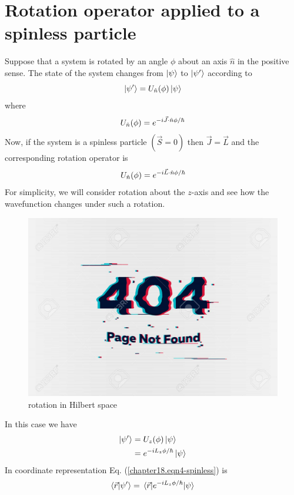 \section{Rotation operator applied to a spinless particle}
Suppose that a system is rotated by an angle $\phi$ about an axis $\hat{n}$ in the positive sense. The state of the system changes from $\ket{\psi}$ to $\ket{\psi^\prime}$ according to 
\begin{equation}
\label{chapter18.eqn1-spinless}
\ket{\psi^\prime} = U_{\hat{n}}\qty(\phi) \ket{\psi}
\end{equation}
where
\begin{equation}
\label{chapter18.eqn2-spinless}
	 U_{\hat{n}}\qty(\phi) = e^{-i \vec{J}\cdot\hat{n} \phi/\hbar}
\end{equation}
Now, if the system is a spinless particle $(\vec{S}=0)$ then $\vec{J} = \vec{L}$ and the corresponding rotation operator is
\begin{equation}
\label{chapter18.eqn3-spinless}
U_{\hat{n}}\qty(\phi) = e^{-i \vec{L}\cdot\hat{n} \phi/\hbar}
\end{equation}
For simplicity, we will consider rotation about the $z$-axis and see how the wavefunction changes under such a rotation.
\begin{figure}
	\centering
	\includegraphics[width=0.5\linewidth]{Pictures/not-found.jpg}
	\caption{rotation in Hilbert space}
	\label{chapter18.fig4}
\end{figure}
In this case we have
\begin{align}
\ket{\psi^\prime} 
&= U_{z}\qty(\phi) \ket{\psi} \nonumber\\
\label{chapter18.eqn4-spinless}
&= e^{-i L_z \phi/\hbar} \ket{\psi}
\end{align}
In coordinate representation Eq. (\ref{chapter18.eqn4-spinless}) is
\begin{equation}
\label{chapter18.eqn5-spinless}
\braket{\vec{r}}{\psi^\prime} = \mel{\vec{r}}{e^{-i L_z \phi/\hbar}}{\psi}
\end{equation}
